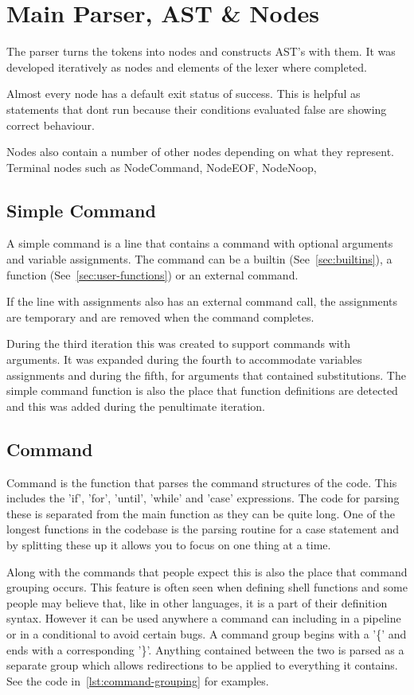 \section{Main Parser, AST \& Nodes}
The parser turns the tokens into nodes and constructs AST's with them.
It was developed iteratively as nodes and elements of the lexer where completed. 

Almost every node has a default exit status of success.
This is helpful as statements that dont run because their conditions evaluated false are showing correct behaviour.

Nodes also contain a number of other nodes depending on what they represent.
Terminal nodes such as NodeCommand, NodeEOF, NodeNoop,

\subsection{Simple Command}
A simple command is a line that contains a command with optional arguments and variable assignments.
The command can be a builtin (See~\ref{sec:builtins}), a function (See~\ref{sec:user-functions}) or an external command.

If the line with assignments also has an external command call, the assignments are temporary and are removed when the command completes.

During the third iteration this was created to support commands with arguments.
It was expanded during the fourth to accommodate variables assignments and during the fifth, for arguments that contained substitutions.
The simple command function is also the place that function definitions are detected and this was added during the penultimate iteration.

\subsection{Command}
Command is the function that parses the command structures of the code.
This includes the 'if', 'for', 'until', 'while' and 'case' expressions.
The code for parsing these is separated from the main function as they can be quite long.
One of the longest functions in the codebase is the parsing routine for a case statement and by splitting these up it allows you to focus on one thing at a time.

Along with the commands that people expect this is also the place that command grouping occurs.
This feature is often seen when defining shell functions and some people may believe that, like in other languages, it is a part of their definition syntax.
However it can be used anywhere a command can including in a pipeline or in a conditional to avoid certain bugs.
A command group begins with a '\{' and ends with a corresponding '\}'.
Anything contained between the two is parsed as a separate group which allows redirections to be applied to everything it contains.
See the code in~\ref{lst:command-grouping} for examples.

